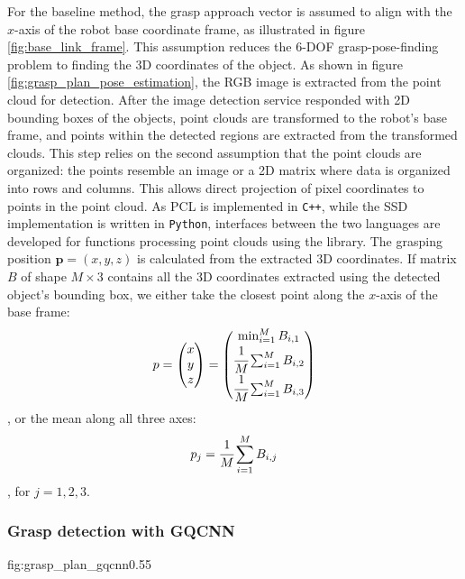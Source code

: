 For the baseline method, the grasp approach vector is assumed to align with the $ x $-axis of the robot base coordinate
frame, as illustrated in figure \ref{fig:base_link_frame}. This assumption reduces the 6-DOF grasp-pose-finding problem
to finding the 3D coordinates of the object. As shown in figure \ref{fig:grasp_plan_pose_estimation}, the RGB image is
extracted from the point cloud for detection. After the image detection service responded with 2D bounding boxes of the
objects, point clouds are transformed to the robot's base frame, and points within the detected regions are extracted
from the transformed clouds. This step relies on the second assumption that the point clouds are organized: the points
resemble an image or a 2D matrix where data is organized into rows and columns. This allows direct projection of pixel
coordinates to points in the point cloud. As PCL is implemented in \texttt{C++}, while the SSD implementation is
written in \texttt{Python}, interfaces between the two languages are developed for functions processing point clouds
using the  library. The grasping
position $ \mathbf{p} = (x, y, z) $ is calculated from the extracted 3D coordinates. If matrix $ B $ of shape
$ M \times 3 $ contains all the 3D coordinates extracted using the detected object's bounding box, we either take the 
closest point along the $ x $-axis of the base frame:
\[ p = \left( \begin{matrix}
x \\ y \\ z
\end{matrix} \right) =
\left( \begin{matrix}
\min_{i = 1}^M B_{i,1} \\
\cfrac{1}{M} \sum_{i = 1}^{M} B_{i,2} \\
\cfrac{1}{M} \sum_{i = 1}^{M} B_{i,3}
\end{matrix} \right) \],
or the mean along all three axes:
\[ p_j = \cfrac{1}{M} \sum_{i = 1}^{M} B_{i,j} \],
for $ j = 1, 2, 3 $.

\subsubsection*{Grasp detection with GQCNN}

             {fig:grasp_plan_gqcnn}{0.55\textwidth}

